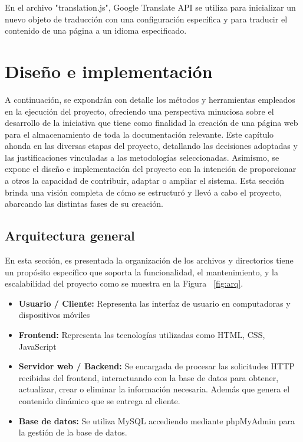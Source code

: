 \documentclass[a4paper, 12pt]{book}
\begin{document}
En el archivo "translation.js", Google Translate API se utiliza para inicializar un nuevo objeto de traducción con una configuración específica y para traducir el contenido de una página a un idioma especificado.


\cleardoublepage
\chapter{Diseño e implementación}
\label{sec:diseno}

A continuación, se expondrán con detalle los métodos y herramientas empleados en la ejecución del proyecto, ofreciendo una perspectiva minuciosa sobre el desarrollo 
de la iniciativa que tiene como finalidad la creación de una página web para el almacenamiento de toda la documentación relevante. Este capítulo ahonda en las diversas 
etapas del proyecto, detallando las decisiones adoptadas y las justificaciones vinculadas a las metodologías seleccionadas. 
Asimismo, se expone el diseño e implementación del proyecto con la intención de proporcionar a otros la capacidad de contribuir, adaptar o ampliar el sistema. 
Esta sección brinda una visión completa de cómo se estructuró y llevó a cabo el proyecto, abarcando las distintas fases de su creación.


\section{Arquitectura general} 
\label{sec:arquitectura}

En esta sección, es presentada la organización de los archivos y directorios tiene un propósito específico que soporta la funcionalidad, el mantenimiento, y la 
escalabilidad del proyecto como se muestra en la Figura ~\ref{fig:arq}. 
\begin{itemize}
  \item \textbf{Usuario / Cliente:} Representa las interfaz de usuario en computadoras y dispositivos móviles
  \item \textbf{Frontend:} Representa las tecnologías utilizadas como HTML, CSS, JavaScript
  \item \textbf{Servidor web / Backend:}  Se encargada de procesar las solicitudes HTTP recibidas del frontend, interactuando con la base de datos para obtener, actualizar, crear o eliminar la información necesaria. Además que genera el contenido dinámico que se entrega al cliente.
  \item \textbf{Base de datos:} Se utiliza MySQL accediendo mediante phpMyAdmin para la gestión de la base de datos.
\end{itemize}
\end{document}
